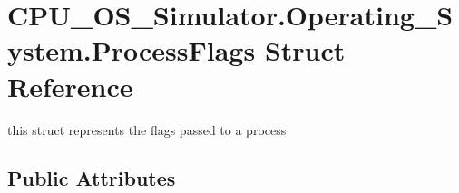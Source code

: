 \hypertarget{struct_c_p_u___o_s___simulator_1_1_operating___system_1_1_process_flags}{}\section{C\+P\+U\+\_\+\+O\+S\+\_\+\+Simulator.\+Operating\+\_\+\+System.\+Process\+Flags Struct Reference}
\label{struct_c_p_u___o_s___simulator_1_1_operating___system_1_1_process_flags}


this struct represents the flags passed to a process  


\subsection*{Public Attributes}
